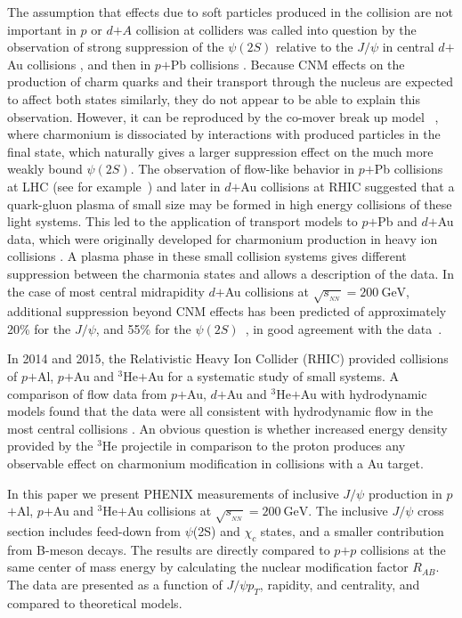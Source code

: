 \documentclass[twocolumn,letterpaper,aps,prc,longbibliography,superscriptaddress,nofootinbib,floatfix]{revtex4-1}
\newcommand{\pt}{\mbox{$p_T$}\xspace}
\newcommand{\sqsntwo}{\mbox{$\sqrt{s_{_{NN}}}=200~\mathrm{GeV}$}\xspace}
\newcommand{\dau}{\mbox{$d$$+$Au}\xspace}
\newcommand{\pau}{\mbox{$p$$+$Au}\xspace}
\newcommand{\pal}{\mbox{$p$$+$Al}\xspace}
\newcommand{\ppb}{\mbox{$p$$+$Pb}\xspace}
\newcommand{\heau}{\mbox{$^{3}$He$+$Au}\xspace}
\newcommand{\jpsi}{\mbox{$J/\psi$}\xspace}
\begin{document}
The assumption that effects due to soft particles produced in the 
collision are not important in $p$ or $d$$+$$A$ collision at colliders 
was called into question by the observation of strong suppression of the 
$\psi(2S)$ relative to the \jpsi in central \dau collisions 
\cite{Adare:2013ezl}, and then in \ppb collisions \cite{Abelev:2014zpa}. 
Because CNM effects on the production of charm quarks and their transport 
through the nucleus are expected to affect both states similarly, they 
do not appear to be able to explain this observation. However, it can be 
reproduced by the co-mover break up model~ \cite{Ferreiro:2014bia}, 
where charmonium is dissociated by interactions with produced particles 
in the final state, which naturally gives a larger suppression effect on 
the much more weakly bound $\psi(2S)$. The observation of flow-like 
behavior in \ppb collisions at LHC (see for 
example~\cite{Dusling:2015gta}) and later in \dau collisions at RHIC 
\cite{Adare:2013piz, Adare:2014keg} suggested that a quark-gluon plasma 
of small size may be formed in high energy collisions of these light 
systems.  This led to the application of transport models to \ppb and 
\dau data, which were originally developed for charmonium production in 
heavy ion collisions \cite{Du:2015wha, Beraudo:2015wsd}.  A plasma phase 
in these small collision systems gives different suppression between the 
charmonia states and allows a description of the data. In the case of 
most central midrapidity \dau collisions at \sqsntwo, additional 
suppression beyond CNM effects has been predicted of approximately 20\% 
for the \jpsi, and 55\% for the $\psi(2S)$~\cite{Du:2015wha}, in good 
agreement with the data~\cite{Adare:2013lkk,Adare:2013ezl}.

In 2014 and 2015, the Relativistic Heavy Ion Collider (RHIC) provided 
collisions of \pal, \pau and \heau for a systematic study of small 
systems. A comparison of flow data from \pau, \dau and \heau with 
hydrodynamic models found that the data were all consistent with 
hydrodynamic flow in the most central collisions \cite{PHENIX:2018lia, 
Koop:2015wea, Adare:2015ctn}. An obvious question is whether increased 
energy density provided by the $^3$He projectile in comparison to the 
proton produces any observable effect on charmonium modification in 
collisions with a Au target.

In this paper we present PHENIX measurements of inclusive \jpsi 
production in \pal, \pau and \heau collisions at \sqsntwo.  The 
inclusive \jpsi cross section includes feed-down from $\psi$(2S) and 
$\chi_c$ states, and a smaller contribution from B-meson decays.  The 
results are directly compared to $p$$+$$p$ collisions at the same center of 
mass energy by calculating the nuclear modification factor $R_{AB}$.  
The data are presented as a function of \jpsi \pt, rapidity, and 
centrality, and compared to theoretical models.
\end{document}
